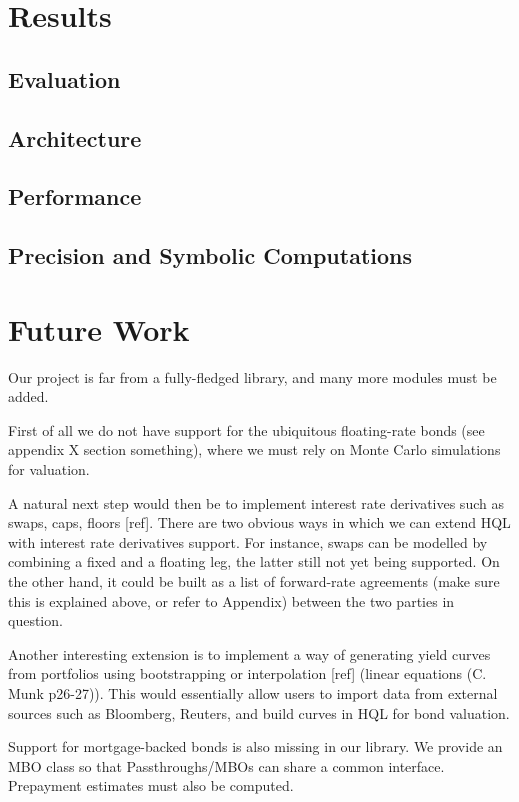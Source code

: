 \chapter{Results}

\section{Evaluation}

\section{Architecture}

\section{Performance}

\section{Precision and Symbolic Computations}

\chapter{Future Work}

Our project is far from a fully-fledged library, and many more modules must be added.

First of all we do not have support for the ubiquitous floating-rate bonds (see appendix X section something), where we must rely on Monte Carlo simulations for valuation.

A natural next step would then be to implement interest rate derivatives such as swaps, caps, floors [ref].
There are two obvious ways in which we can extend HQL with interest rate derivatives support. For instance, swaps can be modelled by combining a fixed and a floating leg, the latter still not yet being supported. On the other hand, it could be built as a list of forward-rate agreements (make sure this is explained above, or refer to Appendix) between the two parties in question.

Another interesting extension is to implement a way of generating yield curves from portfolios using bootstrapping or interpolation [ref] (linear equations (C. Munk p26-27)). This would essentially allow users to import data from external sources such as Bloomberg, Reuters, and build curves in HQL for bond valuation.

Support for mortgage-backed bonds is also missing in our library. We provide an MBO class so that Passthroughs/MBOs can share a common interface. Prepayment estimates must also be computed.


